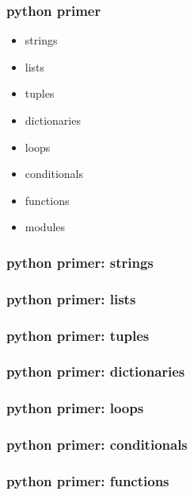\begin{frame} \frametitle{python primer}

\begin{itemize}
   \item strings
   \item lists
   \item tuples
   \item dictionaries
   \item loops
   \item conditionals
   \item functions
   \item modules
\end{itemize}

\end{frame}
\cwpnote{}

\begin{frame} \frametitle{python primer: strings}
\end{frame}

\begin{frame} \frametitle{python primer: lists}
\end{frame}

\begin{frame} \frametitle{python primer: tuples}
\end{frame}

\begin{frame} \frametitle{python primer: dictionaries}
\end{frame}

\begin{frame} \frametitle{python primer: loops}
\end{frame}

\begin{frame} \frametitle{python primer: conditionals}
\end{frame}

\begin{frame} \frametitle{python primer: functions}
\end{frame}


